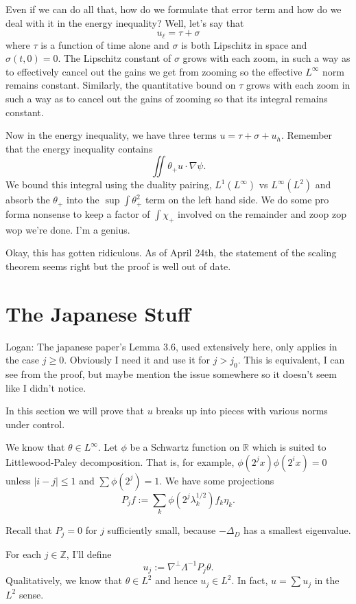 \documentclass[11pt]{amsart}
\theoremstyle{remark}
\newcommand{\R}{\mathbb{R}}
\newcommand{\Z}{\mathbb{Z}}
\newcommand{\grad}{\nabla}
\newcommand{\Laplace}{\Delta}
\newcommand{\eigen}[1]{\eta_{#1}} %
\begin{document}
Even if we can do all that, how do we formulate that error term and how do we deal with it in the energy inequality?  Well, let's say that
\[ u_\ell = \tau + \sigma \]
where $\tau$ is a function of time alone and $\sigma$ is both Lipschitz in space and $\sigma(t,0) = 0$.  The Lipschitz constant of $\sigma$ grows with each zoom, in such a way as to effectively cancel out the gains we get from zooming so the effective $L^\infty$ norm remains constant.  Similarly, the quantitative bound on $\tau$ grows with each zoom in such a way as to cancel out the gains of zooming so that its integral remains constant.  

Now in the energy inequality, we have three terms $u = \tau + \sigma + u_h$.  Remember that the energy inequality contains
\[ \iint \theta_+ u \cdot \grad \psi. \]
We bound this integral using the duality pairing, $L^1(L^\infty)$ vs $L^\infty(L^2)$ and absorb the $\theta_+$ into the $\sup \int \theta_+^2$ term on the left hand side.  We do some pro forma nonsense to keep a factor of $\int \chi_+$ involved on the remainder and zoop zop wop we're done.  I'm a genius.  

Okay, this has gotten ridiculous.  As of April 24th, the statement of the scaling theorem seems right but the proof is well out of date.  




\section{The Japanese Stuff}

Logan: The japanese paper's Lemma 3.6, used extensively here, only applies in the case $j \geq 0$. Obviously I need it and use it for $j > j_0$.  This is equivalent, I can see from the proof, but maybe mention the issue somewhere so it doesn't seem like I didn't notice.  

In this section we will prove that $u$ breaks up into pieces with various norms under control.  

We know that $\theta \in L^\infty$.  Let $\phi$ be a Schwartz function on $\R$ which is suited to Littlewood-Paley decomposition.  That is, for example, $\phi(2^j x) \phi(2^i x) = 0$ unless $|i-j|\leq 1$ and $\sum \phi(2^j) = 1$.  We have some projections 
\[ P_j f := \sum_k \phi(2^j \lambda_k^{1/2}) f_k \eigen{k}. \]

Recall that $P_j = 0$ for $j$ sufficiently small, because $-\Laplace_D$ has a smallest eigenvalue.  

For each $j \in \Z$, I'll define
\[ u_j := \grad^\perp \Lambda^{-1} P_j \theta. \]
Qualitatively, we know that $\theta \in L^2$ and hence $u_j \in L^2$.  In fact, $u = \sum u_j$ in the $L^2$ sense.  
\end{document}
